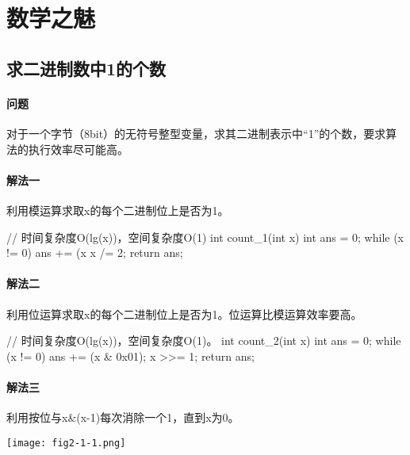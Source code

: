 \chapter{数学之魅}

\section{求二进制数中1的个数} %
\label{sec:number-of-1s-in-binary}


\subsubsection{问题}
对于一个字节（8bit）的无符号整型变量，求其二进制表示中“1”的个数，要求算法的执行效率尽可能高。

\subsubsection{解法一}
利用模运算求取x的每个二进制位上是否为1。
\begin{Code}
// 时间复杂度O(lg(x))，空间复杂度O(1)
int count_1(int x) {
    int ans = 0;
    while (x != 0) {
        ans += (x %
        x /= 2;
    }
    return ans;
}
\end{Code}

\subsubsection{解法二}
利用位运算求取x的每个二进制位上是否为1。位运算比模运算效率要高。
\begin{Code}
// 时间复杂度O(lg(x))，空间复杂度O(1)。
int count_2(int x) {
    int ans = 0;
    while (x != 0) {
        ans += (x & 0x01);
        x >>= 1;
    }
    return ans;
}
\end{Code}

\subsubsection{解法三}
利用按位与x\&(x-1)每次消除一个1，直到x为0。
\begin{center}
	\texttt{[image: fig2-1-1.png]}\\
	\label{fig:number-of-ones-1}
\end{center}

